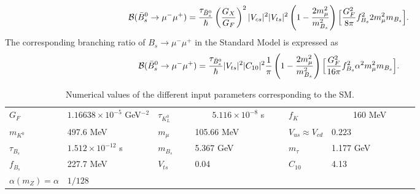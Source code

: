 \documentclass{ws-ijmpa}
\begin{document}
\begin{equation}
\mathcal{B}(\bar{B}^{0}_{s}\rightarrow \mu^{-}\mu^{+})=\frac{\tau_{\bar{B}^0_s}}{\hbar}\left({G_X\over G_F}\right)^2 |V_{cs}|^2|V_{ts}|^2 \left(1-{2m^2
_{\mu}\over {m^2_{B_s}}}\right) \Big[{G^2_F\over 8\pi}f^2_{B_s} 2m^2_{\mu}m_{B_s}\Big]\label{24}.
\end{equation}
The corresponding branching ratio of $B_{s}\rightarrow \mu^{-}\mu^{+}$ in the Standard Model is expressed as
\begin{equation}
\mathcal{B}(\bar{B}^{0}_{s}\rightarrow \mu^{-}\mu^{+}) = \frac{\tau_{\bar{B}^0_s}}{\hbar}|V_{ts}|^2|C_{10}|^2\frac{1}{\pi}\left(1-{2m^2
_{\mu}\over {m^2_{B_s}}}\right) \Big[{G^2_F\over 16\pi}f^2_{B_s} \alpha^2 m^2_{\mu}m_{B_s}\Big]\label{25}.
\end{equation}

\begin{table}
\caption{Numerical values of the different input parameters corresponding to the SM\protect\cite{pdg}.}\label{SM-values}
\begin{tabular}{llllll}
	\hline\hline
 $G_F$ \ \ \ \ \  & $1.16638\times 10^{-5}$ GeV$^{-2}$& $\tau_{K^{0}_L}$ \ \ \ &  \ \ \ \ $5.116\times 10^{-8}$ s \ \ \ &  $f_{K}$ \ \ \ \ & \ \ \ \ \ 160 MeV \ \ \ \ \  \\ 
	 	 $m_{K^{0}}$ & 497.6 MeV & $m_{\mu}$ & 105.66 MeV & $V_{us} \approx V_{cd}$ & $0.223$   \\ 
	 $\tau_{B_{s}}$ & $1.512\times 10^{-12}$ s & $m_{B_{s}}$ & 5.367 GeV  &$m_{\tau}$ & 1.177 GeV \\ 
	 $f_{B_s}$ & 227.7 MeV & $V_{ts}$ & 0.04  & $C_{10}$ & 4.13  \\
	  $\alpha(m_{Z}) = \alpha$ & $1/128 $ & & & &  \\
	\hline\hline
\end{tabular}%
\end{table}
\end{document}
